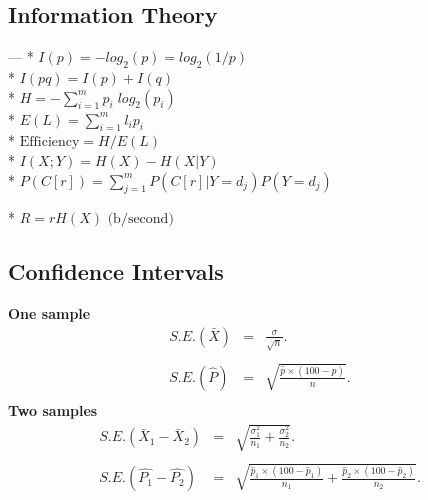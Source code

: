 \subsection*{Information Theory}

--- 
* $I(p) = - log_{2}(p) = log_{2}(1/p)$\\

* $I(pq) = I(p) + I(q)$\\

* $H = - \sum_{i=1}^{m}p_{i}\; log_{2}(p_{i})$\\

* $E(L) = \sum_{i=1}^{m} l_{i} p_{i}$\\

* $\mbox{Efficiency} = H / E(L)$\\

* $I(X;Y) = H(X) - H(X|Y)$\\

* $P(C[r]) = \sum_{j=1}^{m}P(C[r]|Y=d_{j} )P(Y=d_{j} )$

* $R = rH(X) \mbox{      (b/second)}$


\newpage
\subsection*{Confidence Intervals}
{\bf One sample}
\begin{eqnarray*} S.E.(\bar{X})&=&\frac{\sigma}{\sqrt{n}}.\\\\
S.E.(\hat{P})&=&\sqrt{\frac{\hat{p}\times(100-\hat{p})}{n}}.\\
\end{eqnarray*}
{\bf Two samples}
\begin{eqnarray*}
S.E.(\bar{X}_1-\bar{X}_2)&=&\sqrt{\frac{\sigma^2_1}{n_1}+\frac{\sigma_2^2}{n_2}}.\\\\
S.E.(\hat{P_1}-\hat{P_2})&=&\sqrt{\frac{\hat{p}_1\times(100-\hat{p}_1)}{n_1}+\frac{\hat{p}_2\times(100-\hat{p}_2)}{n_2}}.\\\\
\end{eqnarray*}
